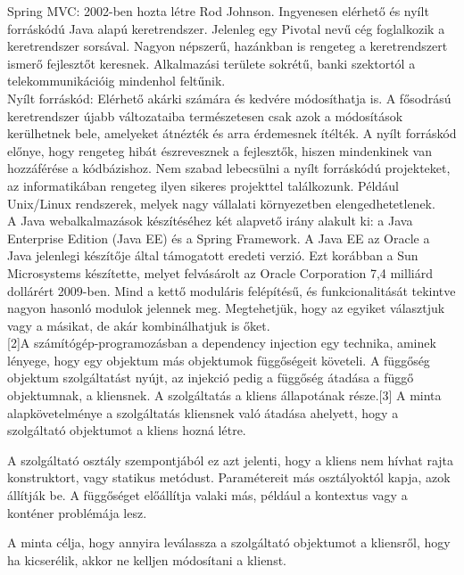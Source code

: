 \documentclass[11pt]{article}
\begin{document}
Spring MVC: 2002-ben hozta létre Rod Johnson. Ingyenesen elérhető és nyílt forráskódú Java alapú keretrendszer. Jelenleg egy Pivotal nevű cég foglalkozik a keretrendszer sorsával. Nagyon népszerű, hazánkban is rengeteg a keretrendszert ismerő fejlesztőt keresnek. Alkalmazási területe sokrétű, banki szektortól a telekommunikációig mindenhol feltűnik.\\

Nyílt forráskód: Elérhető akárki számára és kedvére módosíthatja is. A fősodrású keretrendszer újabb változataiba természetesen csak azok a módosítások kerülhetnek bele, amelyeket átnézték és arra érdemesnek ítélték. A nyílt forráskód előnye, hogy rengeteg hibát észrevesznek a fejlesztők, hiszen mindenkinek van hozzáférése a kódbázishoz. Nem szabad lebecsülni a nyílt forráskódú projekteket, az informatikában rengeteg ilyen sikeres projekttel találkozunk. Például Unix/Linux rendszerek, melyek nagy vállalati környezetben elengedhetetlenek.\\

A Java webalkalmazások készítéséhez két alapvető irány alakult ki: a Java Enterprise Edition (Java EE) és a Spring Framework. A Java EE az Oracle a Java jelenlegi készítője által támogatott eredeti verzió. Ezt korábban a Sun Microsystems készítette, melyet felvásárolt az Oracle Corporation 7,4 milliárd dollárért 2009-ben. Mind a kettő moduláris felépítésű, és funkcionalitását tekintve nagyon hasonló modulok jelennek meg. Megtehetjük, hogy az egyiket választjuk vagy a másikat, de akár kombinálhatjuk is őket.\\

[2]A számítógép-programozásban a dependency injection egy technika, aminek lényege, hogy egy objektum más objektumok függőségeit követeli. A függőség objektum szolgáltatást nyújt, az injekció pedig a függőség átadása a függő objektumnak, a kliensnek. A szolgáltatás a kliens állapotának része.[3] A minta alapkövetelménye a szolgáltatás kliensnek való átadása ahelyett, hogy a szolgáltató objektumot a kliens hozná létre.

A szolgáltató osztály szempontjából ez azt jelenti, hogy a kliens nem hívhat rajta konstruktort, vagy statikus metódust. Paramétereit más osztályoktól kapja, azok állítják be. A függőséget előállítja valaki más, például a kontextus vagy a konténer problémája lesz.

A minta célja, hogy annyira leválassza a szolgáltató objektumot a kliensről, hogy ha kicserélik, akkor ne kelljen módosítani a klienst.
\end{document}
